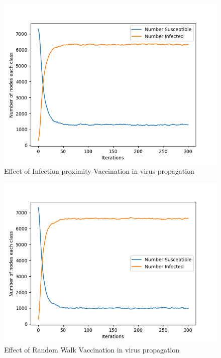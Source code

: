 \documentclass[11pt]{article}
\begin{document}
\begin{figure}
    \centering
    \includegraphics{Assignments/Assignment2/infection-proximity.png}
    \caption{Effect of Infection proximity Vaccination in virus propagation}
    \label{fig:infection}
\end{figure}
\begin{figure}
    \centering
    \includegraphics{Assignments/Assignment2/random-walk.png}
    \caption{Effect of Random Walk Vaccination in virus propagation}
    \label{fig:randwalk}
\end{figure}
\end{document}
